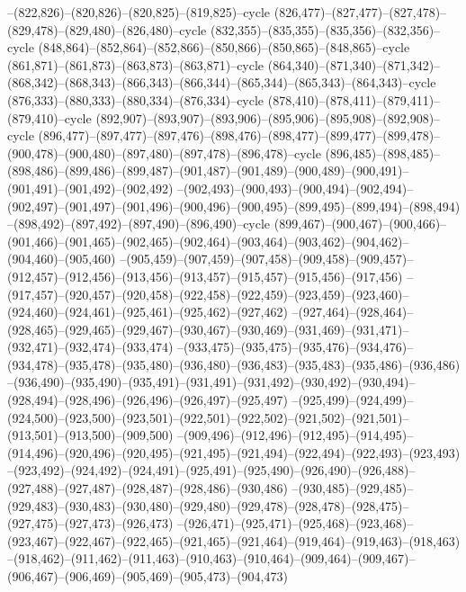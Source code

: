 --(822,826)--(820,826)--(820,825)--(819,825)--cycle
(826,477)--(827,477)--(827,478)--(829,478)--(829,480)--(826,480)--cycle
(832,355)--(835,355)--(835,356)--(832,356)--cycle
(848,864)--(852,864)--(852,866)--(850,866)--(850,865)--(848,865)--cycle
(861,871)--(861,873)--(863,873)--(863,871)--cycle
(864,340)--(871,340)--(871,342)--(868,342)--(868,343)--(866,343)--(866,344)--(865,344)--(865,343)--(864,343)--cycle
(876,333)--(880,333)--(880,334)--(876,334)--cycle
(878,410)--(878,411)--(879,411)--(879,410)--cycle
(892,907)--(893,907)--(893,906)--(895,906)--(895,908)--(892,908)--cycle
(896,477)--(897,477)--(897,476)--(898,476)--(898,477)--(899,477)--(899,478)--(900,478)--(900,480)--(897,480)--(897,478)--(896,478)--cycle
(896,485)--(898,485)--(898,486)--(899,486)--(899,487)--(901,487)--(901,489)--(900,489)--(900,491)--(901,491)--(901,492)--(902,492)
--(902,493)--(900,493)--(900,494)--(902,494)--(902,497)--(901,497)--(901,496)--(900,496)--(900,495)--(899,495)--(899,494)--(898,494)
--(898,492)--(897,492)--(897,490)--(896,490)--cycle
(899,467)--(900,467)--(900,466)--(901,466)--(901,465)--(902,465)--(902,464)--(903,464)--(903,462)--(904,462)--(904,460)--(905,460)
--(905,459)--(907,459)--(907,458)--(909,458)--(909,457)--(912,457)--(912,456)--(913,456)--(913,457)--(915,457)--(915,456)--(917,456)
--(917,457)--(920,457)--(920,458)--(922,458)--(922,459)--(923,459)--(923,460)--(924,460)--(924,461)--(925,461)--(925,462)--(927,462)
--(927,464)--(928,464)--(928,465)--(929,465)--(929,467)--(930,467)--(930,469)--(931,469)--(931,471)--(932,471)--(932,474)--(933,474)
--(933,475)--(935,475)--(935,476)--(934,476)--(934,478)--(935,478)--(935,480)--(936,480)--(936,483)--(935,483)--(935,486)--(936,486)
--(936,490)--(935,490)--(935,491)--(931,491)--(931,492)--(930,492)--(930,494)--(928,494)--(928,496)--(926,496)--(926,497)--(925,497)
--(925,499)--(924,499)--(924,500)--(923,500)--(923,501)--(922,501)--(922,502)--(921,502)--(921,501)--(913,501)--(913,500)--(909,500)
--(909,496)--(912,496)--(912,495)--(914,495)--(914,496)--(920,496)--(920,495)--(921,495)--(921,494)--(922,494)--(922,493)--(923,493)
--(923,492)--(924,492)--(924,491)--(925,491)--(925,490)--(926,490)--(926,488)--(927,488)--(927,487)--(928,487)--(928,486)--(930,486)
--(930,485)--(929,485)--(929,483)--(930,483)--(930,480)--(929,480)--(929,478)--(928,478)--(928,475)--(927,475)--(927,473)--(926,473)
--(926,471)--(925,471)--(925,468)--(923,468)--(923,467)--(922,467)--(922,465)--(921,465)--(921,464)--(919,464)--(919,463)--(918,463)
--(918,462)--(911,462)--(911,463)--(910,463)--(910,464)--(909,464)--(909,467)--(906,467)--(906,469)--(905,469)--(905,473)--(904,473)
